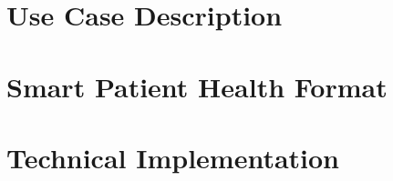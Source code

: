 \chapter{Use Case Description}
\label{chap:usecase}


\chapter{Smart Patient Health Format}
\label{chap:sphf}


\chapter{Technical Implementation}

